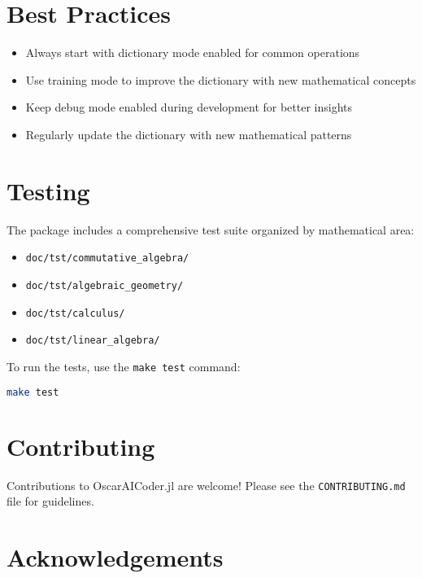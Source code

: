 \documentclass[11pt,a4paper]{article}
\begin{document}
\section{Best Practices}
\label{sec:best_practices}

\begin{itemize}
    \item Always start with dictionary mode enabled for common operations
    \item Use training mode to improve the dictionary with new mathematical concepts
    \item Keep debug mode enabled during development for better insights
    \item Regularly update the dictionary with new mathematical patterns
\end{itemize}

\section{Testing}
\label{sec:testing}

The package includes a comprehensive test suite organized by mathematical area:

\begin{itemize}
    \item \texttt{doc/tst/commutative\_algebra/}
    \item \texttt{doc/tst/algebraic\_geometry/}
    \item \texttt{doc/tst/calculus/}
    \item \texttt{doc/tst/linear\_algebra/}
\end{itemize}

To run the tests, use the \texttt{make test} command:

\begin{lstlisting}[language=bash]
make test
\end{lstlisting}

\section{Contributing}
\label{sec:contributing}

Contributions to OscarAICoder.jl are welcome! Please see the \texttt{CONTRIBUTING.md} file for guidelines.

\section*{Acknowledgements}
\label{sec:acknowledgements}
\end{document}
